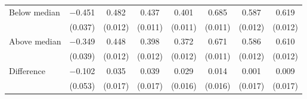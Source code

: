 \begin{tabular}[t]{lccccccc}
\hspace{1em} Below median & \num{-0.451} & \num{0.482} & \num{0.437} & \num{0.401} & \num{0.685} & \num{0.587} & \num{0.619}\\
 & (\num{0.037}) & (\num{0.012}) & (\num{0.011}) & (\num{0.011}) & (\num{0.011}) & (\num{0.012}) & (\num{0.012})\\
\hspace{1em} Above median & \num{-0.349} & \num{0.448} & \num{0.398} & \num{0.372} & \num{0.671} & \num{0.586} & \num{0.610}\\
 & (\num{0.039}) & (\num{0.012}) & (\num{0.012}) & (\num{0.012}) & (\num{0.011}) & (\num{0.012}) & (\num{0.012})\\\cmidrule(lr){2-8}
\hspace{1em} Difference & \num{-0.102} & \num{0.035} & \num{0.039} & \num{0.029} & \num{0.014} & \num{0.001} & \num{0.009}\\
 & (\num{0.053}) & (\num{0.017}) & (\num{0.017}) & (\num{0.016}) & (\num{0.016}) & (\num{0.017}) & (\num{0.017})\\
\end{tabular}
